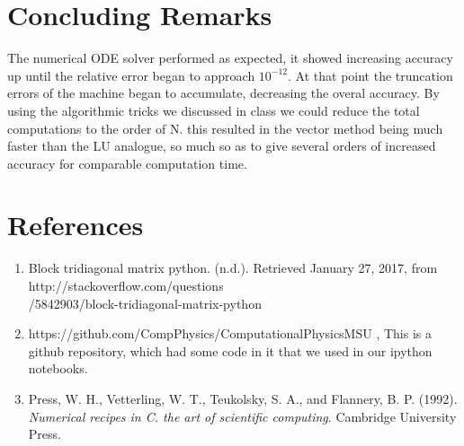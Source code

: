 \documentclass{article}
\begin{document}
\section{Concluding Remarks}
The numerical ODE solver performed as expected, it showed increasing accuracy up until the relative error began to approach $10^{-12}$. At that point the truncation errors of the machine began to accumulate, decreasing the overal accuracy. 
By using the algorithmic tricks we discussed in class we could reduce the total computations to the order of N. this resulted in the vector method being much faster than the LU analogue, so much so as to give several orders of increased accuracy for comparable computation time.  

\section{References}
\begin{enumerate}
	\item  Block tridiagonal matrix python. (n.d.). Retrieved January 27, 2017, from http://stackoverflow.com/questions\\/5842903/block-tridiagonal-matrix-python
	
	\item https://github.com/CompPhysics/ComputationalPhysicsMSU , This is a github repository, which had some code in it that we used in our ipython notebooks.
	
	
	
	\item Press, W. H., Vetterling, W. T., Teukolsky, S. A., and Flannery, B. P. (1992). \textit{Numerical recipes in C. the art of scientific computing}. Cambridge University Press.
\end{enumerate}
\end{document}
